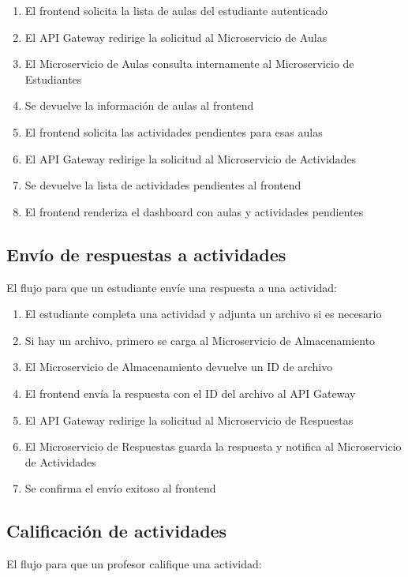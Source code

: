 \documentclass[12pt,a4paper]{report}
\begin{document}
\begin{enumerate}
    \item El frontend solicita la lista de aulas del estudiante autenticado
    \item El API Gateway redirige la solicitud al Microservicio de Aulas
    \item El Microservicio de Aulas consulta internamente al Microservicio de Estudiantes
    \item Se devuelve la información de aulas al frontend
    \item El frontend solicita las actividades pendientes para esas aulas
    \item El API Gateway redirige la solicitud al Microservicio de Actividades
    \item Se devuelve la lista de actividades pendientes al frontend
    \item El frontend renderiza el dashboard con aulas y actividades pendientes
\end{enumerate}

\subsection{Envío de respuestas a actividades}
El flujo para que un estudiante envíe una respuesta a una actividad:

\begin{enumerate}
    \item El estudiante completa una actividad y adjunta un archivo si es necesario
    \item Si hay un archivo, primero se carga al Microservicio de Almacenamiento
    \item El Microservicio de Almacenamiento devuelve un ID de archivo
    \item El frontend envía la respuesta con el ID del archivo al API Gateway
    \item El API Gateway redirige la solicitud al Microservicio de Respuestas
    \item El Microservicio de Respuestas guarda la respuesta y notifica al Microservicio de Actividades
    \item Se confirma el envío exitoso al frontend
\end{enumerate}

\subsection{Calificación de actividades}
El flujo para que un profesor califique una actividad:
\end{document}
